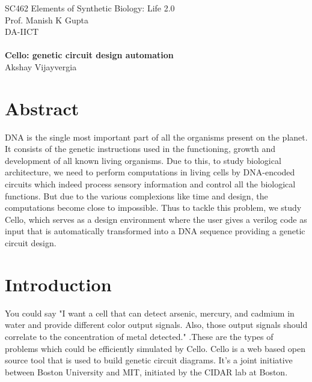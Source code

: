 \documentclass[11pt]{article}
\begin{document}

\begin{center}
{\large SC462 Elements of Synthetic Biology: Life 2.0} \\
Prof. Manish K Gupta \\
DA-IICT\\
\bigskip
\hspace{0.25in} \\
{\Large\bf Cello: genetic circuit design automation} \\
Akshay Vijayvergia
\end{center}

\bigskip
\bigskip
\bigskip
\bigskip
\section*{Abstract}
DNA is the single most important part of all the organisms present on the planet. It consists of the genetic instructions used in the functioning, growth and development of all known living organisms. Due to this, to study biological architecture, we need to perform computations in living cells by DNA-encoded circuits which indeed process sensory information and control all the biological functions. But due to the various complexions like time and design, the computations become close to impossible. Thus to tackle this problem, we study Cello, which serves as a design environment where the user gives a verilog code as input that is automatically transformed into a DNA sequence providing a genetic circuit design. 


\bigskip
\section*{Introduction}

You could say "I want a cell that can detect arsenic, mercury, and cadmium in water and provide different color output signals. Also, those output signals should correlate to the concentration of metal detected." .These are the types of problems which could be efficiently simulated by Cello. Cello is a web based open source tool that is used to build genetic circuit diagrams. It's a joint initiative between Boston University and MIT, initiated by the CIDAR lab at Boston.

\bigskip
\end{document}
